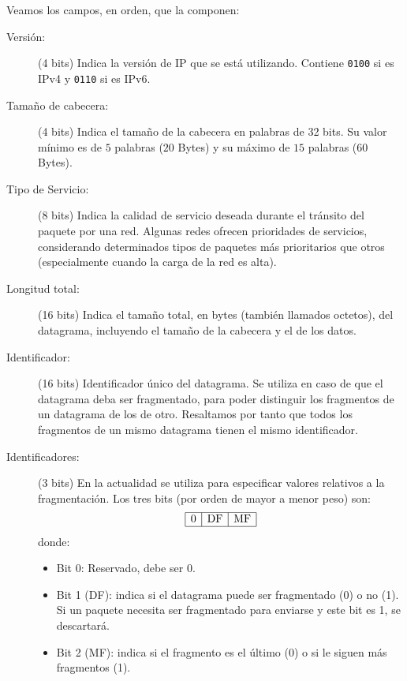Veamos los campos, en orden, que la componen:
\begin{description}
    \item[Versión:] (4 bits) Indica la versión de \acrshort{IP} que se está utilizando. Contiene \verb|0100| si es \acrshort{IPv4} y \verb|0110| si es \acrshort{IPv6}.
    \item[Tamaño de cabecera:] (4 bits) Indica el tamaño de la cabecera en palabras de 32 bits. Su valor mínimo es de $5$ palabras ($20$ Bytes) y su máximo de $15$ palabras ($60$ Bytes).
    \item[Tipo de Servicio:] (8 bits) Indica la calidad de servicio deseada durante el tránsito del paquete por una red. Algunas redes ofrecen prioridades de servicios, considerando determinados tipos de paquetes más prioritarios que otros (especialmente cuando la carga de la red es alta).
    \item[Longitud total:] (16 bits) Indica el tamaño total, en bytes (también llamados octetos), del datagrama, incluyendo el tamaño de la cabecera y el de los datos.
    \item[Identificador:] (16 bits) Identificador único del datagrama. Se utiliza en caso de que el datagrama deba ser fragmentado, para poder distinguir los fragmentos de un datagrama de los de otro. Resaltamos por tanto que todos los fragmentos de un mismo datagrama tienen el mismo identificador.
    \item[Identificadores:] (3 bits) En la actualidad se utiliza para especificar valores relativos a la fragmentación. Los tres bits (por orden de mayor a menor peso) son:
    \begin{equation*}
        \begin{array}{|c|c|c|}
            \hline
            0 & \text{DF} & \text{MF} \\ \hline
        \end{array}
    \end{equation*}
    donde:
        \begin{itemize}
            \item Bit 0: Reservado, debe ser 0.
            \item Bit 1 (\acrfull{DF}): indica si el datagrama puede ser fragmentado (0) o no (1). Si un paquete necesita ser fragmentado para enviarse y este bit es 1, se descartará.
            \item Bit 2 (\acrfull{MF}): indica si el fragmento es el último (0) o si le siguen más fragmentos (1).
        \end{itemize}


\end{description}
